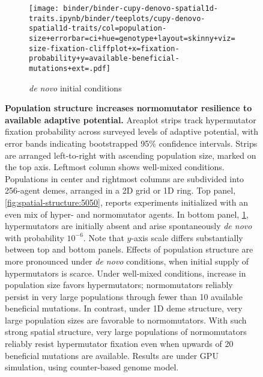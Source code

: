 \begin{figure}[h]
\begin{minipage}{\textwidth}
\begin{subfigure}[b]{\linewidth}
\begin{minipage}{0.25\textwidth}
        \end{minipage}%
      \begin{minipage}{0.12\textwidth}
        \raggedright
        \large
        \vspace{10ex}
        \caption{\textit{de novo} initial conditions}
        \label{fig:spatial-structure:denovo}

        \texttt{[image: binder/binder-cupy-denovo-spatial1d-traits.ipynb/binder/teeplots/cupy-denovo-spatial1d-traits/col=population-size+errorbar=ci+hue=genotype+layout=skinny+viz=size-fixation-cliffplot+x=fixation-probability+y=available-beneficial-mutations+ext=.pdf]}%
      \end{minipage}%
    \end{subfigure}%

  \end{minipage}

  \vspace{-10ex}

  \begin{minipage}{\textwidth}
    \caption{%
      \textbf{Population structure increases normomutator resilience to available adaptive potential.}
      \footnotesize
      Areaplot strips track hypermutator fixation probability across surveyed levels of adaptive potential, with error bands indicating bootstrapped 95\% confidence intervals.
      Strips are arranged left-to-right with ascending population size, marked on the top axis.
      Leftmost column shows well-mixed conditions.
      Populations in center and rightmost columns are subdivided into 256-agent demes, arranged in a 2D grid or 1D ring.
      Top panel, \ref{fig:spatial-structure:5050}, reports experiments initialized with an even mix of hyper- and normomutator agents.
      In bottom panel, \ref{fig:spatial-structure:denovo}, hypermutators are initially absent and arise spontaneously \textit{de novo} with probability $10^{-6}$.
      Note that $y$-axis scale differs substantially between top and bottom panels.
      Effects of population structure are more pronounced under \textit{de novo} conditions, when initial supply of hypermutators is scarce.
      Under well-mixed conditions, increase in population size favors hypermutators; normomutators reliably persist in very large populations through fewer than 10 available beneficial mutations.
      In contrast, under 1D deme structure, very large population sizes are favorable to normomutators.
      With such strong spatial structure, very large populations of normomutators reliably resist hypermutator fixation even when upwards of 20 beneficial mutations are available.
      Results are under GPU simulation, using counter-based genome model.
    }
    \label{fig:spatial-structure}
  \end{minipage}
\end{figure}
